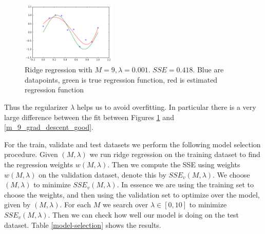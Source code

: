 \documentclass[10pt]{article}
\begin{document}
%
\begin{figure}[h]
\centering
\includegraphics[width=0.4\textwidth]{m_9_lam_0-001}
\caption{Ridge regression with $M = 9, \lambda = 0.001$. $SSE = 0.418$. Blue are datapoints, green is true regression function, red is estimated regression function}
\label{ridge_m_9_lam_0-001}
\end{figure}
%
Thus the regularizer $\lambda$ helps us to avoid overfitting. In particular there is a very large difference between the fit between Figures \ref{ridge_m_9_lam_0-001} and \ref{m_9_grad_descent_good}.

For the train, validate and test datasets we perform the following model selection procedure. Given $(M,\lambda)$ we run ridge regression on the training dataset to find the regression weights $w(M,\lambda)$. Then we compute the SSE using weights $w(M,\lambda)$ on the validation dataset, denote this by $SSE_v(M,\lambda)$. We choose $(M,\lambda)$ to minimize $SSE_v(M,\lambda)$. In essence we are using the training set to choose the weights, and then using the validation set to optimize over the model, given by $(M,\lambda)$. For each $M$ we search over $\lambda \in [0,10]$ to minimize $SSE_v(M,\lambda)$. Then we can check how well our model is doing on the test dataset. Table \ref{model-selection} shows the results.
\end{document}
